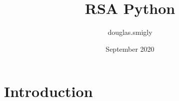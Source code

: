 \documentclass{article}
\title{RSA Python}
\author{douglas.smigly }
\date{September 2020}
\begin{document}
\maketitle

\section{Introduction}
\end{document}
